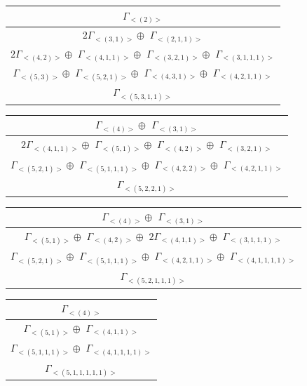 \begin{minipage}{.55\textwidth}
\centering
\begin{tabular}{|c|}\hline
$\Gamma_{<(
2
)>}$
\\ \hline
$ 2 \Gamma_{<(
3 , 
1
)>} \oplus$
$\Gamma_{<(
2 , 
1 , 
1
)>}$
\\ \hline
$ 2 \Gamma_{<(
4 , 
2
)>} \oplus$
$\Gamma_{<(
4 , 
1 , 
1
)>} \oplus$
$\Gamma_{<(
3 , 
2 , 
1
)>} \oplus$
$\Gamma_{<(
3 , 
1 , 
1 , 
1
)>}$
\\ \hline
$\Gamma_{<(
5 , 
3
)>} \oplus$
$\Gamma_{<(
5 , 
2 , 
1
)>} \oplus$
$\Gamma_{<(
4 , 
3 , 
1
)>} \oplus$
$\Gamma_{<(
4 , 
2 , 
1 , 
1
)>}$
\\ \hline
$\Gamma_{<(
5 , 
3 , 
1 , 
1
)>}$
\\
\hline\end{tabular}\end{minipage}
\bigskip
\begin{minipage}{.51\textwidth}
\centering
\begin{tabular}{|c|}\hline
$\Gamma_{<(
4
)>} \oplus$
$\Gamma_{<(
3 , 
1
)>}$
\\ \hline
$ 2 \Gamma_{<(
4 , 
1 , 
1
)>} \oplus$
$\Gamma_{<(
5 , 
1
)>} \oplus$
$\Gamma_{<(
4 , 
2
)>} \oplus$
$\Gamma_{<(
3 , 
2 , 
1
)>}$
\\ \hline
$\Gamma_{<(
5 , 
2 , 
1
)>} \oplus$
$\Gamma_{<(
5 , 
1 , 
1 , 
1
)>} \oplus$
$\Gamma_{<(
4 , 
2 , 
2
)>} \oplus$
$\Gamma_{<(
4 , 
2 , 
1 , 
1
)>}$
\\ \hline
$\Gamma_{<(
5 , 
2 , 
2 , 
1
)>}$
\\
\hline\end{tabular}\end{minipage}
\begin{minipage}{.61\textwidth}
\centering
\begin{tabular}{|c|}\hline
$\Gamma_{<(
4
)>} \oplus$
$\Gamma_{<(
3 , 
1
)>}$
\\ \hline
$\Gamma_{<(
5 , 
1
)>} \oplus$
$\Gamma_{<(
4 , 
2
)>} \oplus$
$ 2 \Gamma_{<(
4 , 
1 , 
1
)>} \oplus$
$\Gamma_{<(
3 , 
1 , 
1 , 
1
)>}$
\\ \hline
$\Gamma_{<(
5 , 
2 , 
1
)>} \oplus$
$\Gamma_{<(
5 , 
1 , 
1 , 
1
)>} \oplus$
$\Gamma_{<(
4 , 
2 , 
1 , 
1
)>} \oplus$
$\Gamma_{<(
4 , 
1 , 
1 , 
1 , 
1
)>}$
\\ \hline
$\Gamma_{<(
5 , 
2 , 
1 , 
1 , 
1
)>}$
\\
\hline\end{tabular}\end{minipage}
\bigskip
\begin{minipage}{.3\textwidth}
\centering
\begin{tabular}{|c|}\hline
$\Gamma_{<(
4
)>}$
\\ \hline
$\Gamma_{<(
5 , 
1
)>} \oplus$
$\Gamma_{<(
4 , 
1 , 
1
)>}$
\\ \hline
$\Gamma_{<(
5 , 
1 , 
1 , 
1
)>} \oplus$
$\Gamma_{<(
4 , 
1 , 
1 , 
1 , 
1
)>}$
\\ \hline
$\Gamma_{<(
5 , 
1 , 
1 , 
1 , 
1 , 
1
)>}$
\\
\hline\end{tabular}\end{minipage}

